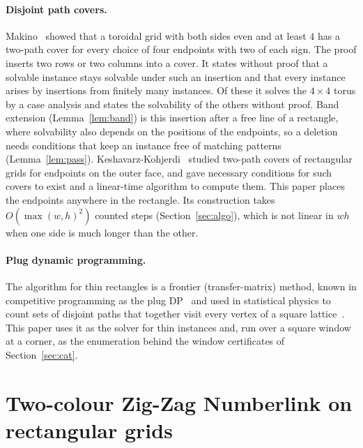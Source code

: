 \documentclass[11pt]{article}
\makeatletter
\newcommand{\secmark}[1]{\pdfsavepos\protected@write\@auxout{}{\string\secpos{#1}{\thepage}{\noexpand\the\noexpand\pdflastypos}}}
\def\secpos#1#2#3{}
\makeatother
\begin{document}
\paragraph{Disjoint path covers.} Makino~\cite{makino06} showed that a toroidal grid with both
sides even and at least $4$ has a two-path cover for every choice of four endpoints with two of
each sign. The proof inserts two rows or two columns into a cover. It states without proof that a
solvable instance stays solvable under such an insertion and that every instance arises by
insertions from finitely many instances. Of these it solves the $4\times 4$ torus by a case
analysis and states the solvability of the others without proof. Band extension
(Lemma~\ref{lem:band}) is this insertion after a free line of a rectangle, where solvability also
depends on the positions of the endpoints, so a deletion needs conditions that keep an instance free of matching
patterns (Lemma~\ref{lem:pass}).
Keshavarz-Kohjerdi~\cite{kk24} studied two-path covers of rectangular grids for endpoints on the
outer face, and gave necessary conditions for such covers to exist and a linear-time algorithm to
compute them. This paper places the endpoints anywhere in the rectangle. Its construction takes
$O(\max(w,h)^2)$ counted steps (Section~\ref{sec:algo}), which is not linear in $wh$ when one side
is much longer than the other.

\paragraph{Plug dynamic programming.} The algorithm for thin rectangles is a frontier
(transfer-matrix) method, known in competitive programming as the plug DP~\cite{chen08,oiwiki} and
used in statistical physics to count sets of disjoint paths that together visit every vertex of a
square lattice~\cite{jacobsen07}. This paper uses it as the solver for thin instances and, run over
a square window at a corner, as the enumeration behind the window certificates of
Section~\ref{sec:cat}.

\secmark{main}
\section{Two-colour Zig-Zag Numberlink on rectangular grids}\label{sec:main}
\end{document}
